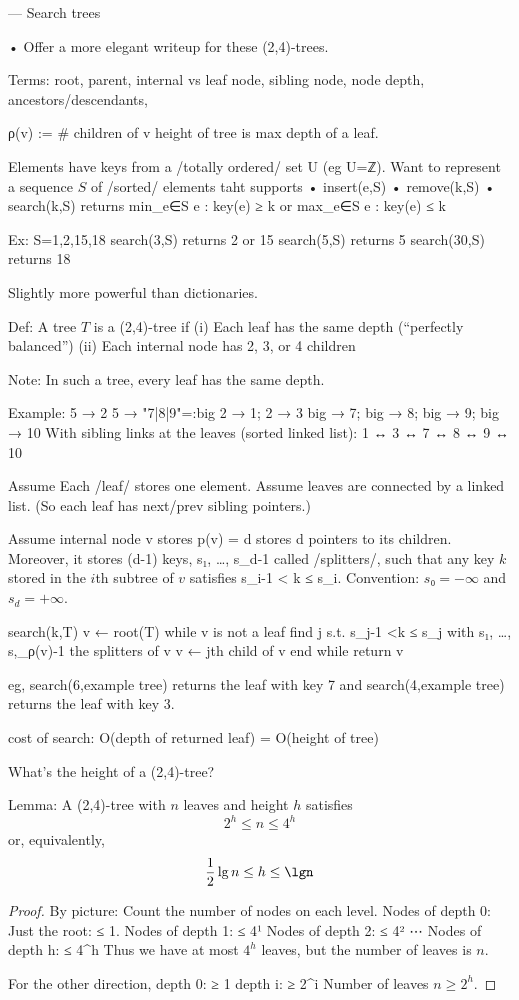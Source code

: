 — Search trees

• Offer a more elegant writeup for these (2,4)-trees.

Terms:
	root, parent, internal vs leaf node, sibling node, node depth,
	ancestors/descendants,

ρ(v) := # children of v
height of tree is max depth of a leaf.

Elements have keys from a /totally ordered/ set U (eg U=ℤ).
Want to represent a sequence $S$ of /sorted/ elements taht supports
• insert(e,S)
• remove(k,S)
• search(k,S) returns min_{e∈S}{ e : key(e) ≥ k } or max_{e∈S} {e : key(e) ≤ k}

Ex: S={1,2,15,18}
	search(3,S) returns 2 or 15
	search(5,S) returns 5
	search(30,S) returns 18

Slightly more powerful than dictionaries.

Def: A tree $T$ is a (2,4)-tree if
	(i) Each leaf has the same depth (``perfectly balanced'')
	(ii) Each internal node has 2, 3, or 4 children

Note: In such a tree, every leaf has the same depth.

Example:
	5 → 2
	5 → "7|8|9"=:big
	2 → 1; 2 → 3
	big → 7; big → 8; big → 9; big → 10
With sibling links at the leaves (sorted linked list):
	1 ↔ 3 ↔ 7 ↔ 8 ↔ 9 ↔ 10

Assume Each /leaf/ stores one element.
Assume leaves are connected by a linked list. (So each leaf has next/prev sibling pointers.)

Assume internal node v stores p(v) = d stores d pointers to its children.
Moreover, it stores (d-1) keys, s₁, …, s_{d-1} called /splitters/, such that
	any key $k$ stored in the $i$th subtree of $v$ satisfies
	s_{i-1} < k ≤ s_{i}.
Convention: $s₀ = -∞$ and $s_d = +∞$.

search(k,T)
	v ← root(T)
	while v is not a leaf
		find j s.t. s_{j-1} <k ≤ s_j
		with s₁, …, s,_{ρ(v)-1} the splitters of v
		v ← jth child of v
	end while
	return v

eg, search(6,example tree) returns the leaf with key 7
and search(4,example tree) returns the leaf with key 3.

cost of search: O(depth of returned leaf) = O(height of tree)

What's the height of a (2,4)-tree?

Lemma:
	A (2,4)-tree with $n$ leaves and height $h$ satisfies
	\[
		2^h ≤ n≤ 4^h
	\]
	or, equivalently,
	\[
		\frac{1}{2} \lg n \le h \le \lgn
	\]
\begin{proof}
	By picture:
	Count the number of nodes on each level.
	Nodes of depth 0: Just the root: ≤ 1.
	Nodes of depth 1: ≤ 4¹
	Nodes of depth 2: ≤ 4²
	⋯
	Nodes of depth h: ≤ 4^h
	Thus we have at most $4^h$ leaves, but the number of leaves is $n$.
	
	For the other direction,
	depth 0:	≥ 1
	depth i:	≥ 2^i
	Number of leaves $n ≥ 2^h$.
\end{proof}

